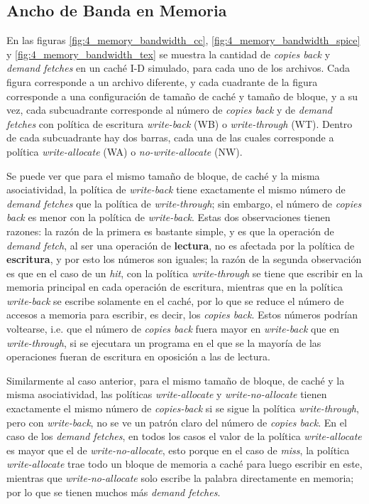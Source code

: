 \documentclass{article}
\begin{document}
\subsection{Ancho de Banda en Memoria}


En las figuras \ref{fig:4_memory_bandwidth_cc}, \ref{fig:4_memory_bandwidth_spice} y \ref{fig:4_memory_bandwidth_tex} se muestra la cantidad de \textit{copies back} y \textit{demand fetches} en un caché I-D simulado, para cada uno de los archivos. Cada figura corresponde a un archivo diferente, y cada cuadrante de la figura corresponde a una configuración de tamaño de caché y tamaño de bloque, y a su vez, cada subcuadrante corresponde al número de \textit{copies back} y de \textit{demand fetches} con política de escritura \textit{write-back} (WB) o \textit{write-through} (WT). Dentro de cada subcuadrante hay dos barras, cada una de las cuales corresponde a política \textit{write-allocate} (WA) o \textit{no-write-allocate} (NW).

Se puede ver que para el mismo tamaño de bloque, de caché y la misma asociatividad, la política de \textit{write-back} tiene exactamente el mismo número de \textit{demand fetches} que la política de \textit{write-through}; sin embargo, el número de \textit{copies back} es menor con la política de \textit{write-back}. Estas dos observaciones tienen razones: la razón de la primera es bastante simple, y es que la operación de \textit{demand fetch}, al ser una operación de \textbf{lectura}, no es afectada por la política de \textbf{escritura}, y por esto los números son iguales; la razón de la segunda observación es que en el caso de un \textit{hit}, con la política \textit{write-through} se tiene que escribir en la memoria principal en cada operación de escritura, mientras que en la política \textit{write-back} se escribe solamente en el caché, por lo que se reduce el número de accesos a memoria para escribir, es decir, los \textit{copies back}. Estos números podrían voltearse, i.e. que el número de \textit{copies back} fuera mayor en \textit{write-back} que en \textit{write-through}, si se ejecutara un programa en el que se la mayoría de las operaciones fueran de escritura en oposición a las de lectura.

Similarmente al caso anterior, para el mismo tamaño de bloque, de caché y la misma asociatividad, las políticas \textit{write-allocate} y \textit{write-no-allocate} tienen exactamente el mismo número de \textit{copies-back} si se sigue la política \textit{write-through}, pero con \textit{write-back}, no se ve un patrón claro del número de \textit{copies back}. En el caso de los \textit{demand fetches}, en todos los casos el valor de la política \textit{write-allocate} es mayor que el de \textit{write-no-allocate}, esto porque en el caso de \textit{miss}, la política \textit{write-allocate} trae todo un bloque de memoria a caché para luego escribir en este, mientras que \textit{write-no-allocate} solo escribe la palabra directamente en memoria; por lo que se tienen muchos más \textit{demand fetches}.
\end{document}
